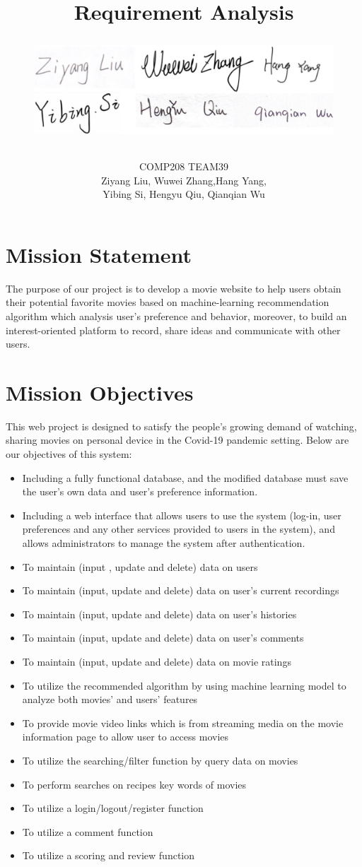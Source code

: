 \documentclass[10pt]{article}
\title{
\vspace{-1cm}
{Requirement Analysis}
\item
\begin{figure}[H]
\centering
\includegraphics[scale = 0.15]{sign.jpg}
\end{figure}
}
\date{}
\author{COMP208 TEAM39\\Ziyang Liu, Wuwei Zhang,Hang Yang, \\Yibing Si, Hengyu Qiu, Qianqian Wu}
\begin{document}
\maketitle

\section{Mission Statement}
The purpose of our project is to develop a movie website to help users obtain their potential favorite movies based on machine-learning recommendation algorithm which analysis user's preference and behavior, moreover, to build an interest-oriented platform to record, share ideas and communicate with other users.



\section{Mission Objectives}
This web project is designed to satisfy the people's growing demand of watching, sharing movies on personal device in the Covid-19 pandemic setting. Below are our objectives of this system: 
\begin{itemize}
\item Including a fully functional database, and the modified database must save the user's own data and user's preference information.
\item Including a web interface that allows users to use the system (log-in, user preferences and any other services provided to users in the system), and allows administrators to manage the system after authentication.
\item To maintain (input , update and delete) data on users
\item To maintain (input, update and delete) data on user’s current recordings
\item To maintain (input, update and delete) data on user’s histories
\item To maintain (input, update and delete) data on user’s comments
\item To maintain (input, update and delete) data on movie ratings
\item To utilize the recommended algorithm by using machine learning model to analyze both movies' and users' features
\item To provide movie video links which is from streaming media on the movie information page to allow user to access movies
\item To utilize the searching/filter function by query data on movies
\item To perform searches on recipes key words of movies
\item To utilize a login/logout/register function 
\item To utilize a comment function
\item To utilize a scoring and review function
\end{itemize}
\end{document}
